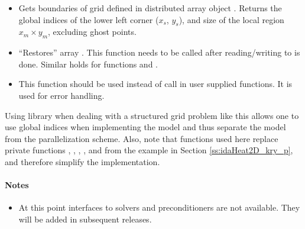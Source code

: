 \begin{itemize}
\item {}
  \par Gets boundaries of grid defined in distributed array object .
  Returns the global indices of the lower left corner ($x_s$, $y_s$), 
  and size of the local region $x_m \times y_m$, excluding ghost points. 
  
\item {}
  \par ``Restores'' array . This function needs to be called after 
  reading/writing to  is done. Similar holds for functions 
   and .
  
\item {}
  \par This function should be used instead of  call in user
  supplied {\petsc} functions. It is used for error handling.
  
\end{itemize}

Using {\petsc} library when dealing with a structured grid problem like this 
allows one to use global indices when implementing the model and thus 
separate the model from the parallelization scheme. Also, note that {\petsc} 
functions used here replace private functions , , 
, ,  and  from the 
 example in Section \ref{ss:idaHeat2D_kry_p}, and 
therefore simplify the implementation.


\paragraph{\bf Notes} 
           
\begin{itemize}
                                        
\item
  {\warn}At this point interfaces to {\petsc} solvers and preconditioners are 
  not available. They will be added in subsequent {\sundials} releases. 

\end{itemize}




